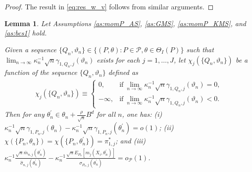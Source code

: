 \documentclass[letterpaper,11pt]{article}
\theoremstyle{myplain}
\newtheorem{lemma}{Lemma}[section]
\theoremstyle{mydefinition}
\theoremstyle{myremark}
\newcommand{\cP}{\mathcal{P}}
\numberwithin{equation}{section}
\numberwithin{figure}{section}
\begin{document}
\begin{appendices}
\begin{proof}
The result in \eqref{eq:res_w_v} follows from similar arguments.
\end{proof}

\begin{lemma}\label{lem:Jstar}
Let Assumptions \ref{as:momP_AS}, \ref{as:GMS}, \ref{as:momP_KMS}, and \ref{as:bcs1} hold. 

Given a sequence $\{Q_n,\vartheta_n\} \in \{(P,\theta):P \in \cP,\theta \in \Theta_I(P)\}$ such that $\lim_{n \to \infty} \kappa_n^{-1}\sqrt{n}\gamma_{1,Q_n,j}(\vartheta_n)$ exists for each $j=1,\dots,J$, let $\chi_j(\{Q_n,\vartheta_n\})$ be a function of the sequence $\{Q_n,\vartheta_n\}$ defined as
\begin{align}
\label{eq:chi}
\chi_j(\{Q_n,\vartheta_n\}) \equiv \left\{ \begin{array}{ll}
	0, & \mathrm{if}~ \lim_{n \to \infty} \kappa_n^{-1}\sqrt{n}\gamma_{1,Q_n,j}(\vartheta_n) = 0, \\ 
	-\infty, & \mathrm{if}~ \lim_{n \to \infty} \kappa_n^{-1}\sqrt{n}\gamma_{1,Q_n,j}(\vartheta_n) < 0.
	\end{array} 
	\right. 
\end{align} 
Then for any $\theta^\prime_n \in \theta_n +\frac{\rho }{\sqrt n}B^d$ for all $n$, one has:  (i) $\kappa_n^{-1}\sqrt{n}\gamma_{1,P_n,j}(\theta_n)-\kappa_n^{-1}\sqrt{n}\gamma_{1,P_n,j}(\theta_n^\prime) =o(1)$; (ii) $\chi(\{P_n,\theta_n\})=\chi(\{P_n,\theta_n^\prime\})=\pi^*_{1,j}$; and (iii) $\kappa_n^{-1}\frac{\sqrt n \bar{m}_{n,j}(\theta^\prime_{n})}{\hat{\sigma}_{n,j}(\theta^\prime_{n})}-\kappa_n^{-1}\frac{\sqrt nE_{P_n}[m_j(X_i,\theta^\prime_{n})]}{\sigma_{P_n,j}(\theta^\prime_{n})} =o_\cP(1)$.
\end{lemma}


\end{appendices}
\end{document}
